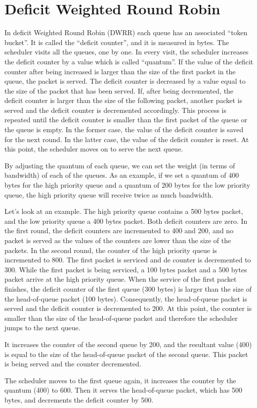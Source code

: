 \section{Deficit Weighted Round Robin}

In deficit Weighted Round Robin (DWRR) each queue has an associated ``token bucket''.
It is called the ``deficit counter'', and it is measured in bytes.
The scheduler visits all the queues, one by one.
In every visit, the scheduler increases the deficit counter by a value which is called ``quantum''.
If the value of the deficit counter after being increased is larger than the size of the first packet in the queue, the packet is served.
The deficit counter is decreased by a value equal to the size of the packet that has been served.
If, after being decremented, the deficit counter is larger than the size of the following packet, another packet is served and the deficit counter is decremented accordingly.
This process is repeated until the deficit counter is smaller than the first packet of the queue or the queue is empty.
In the former case, the value of the deficit counter is saved for the next round.
In the latter case, the value of the deficit counter is reset.
At this point, the scheduler moves on to serve the next queue.

By adjusting the quantum of each queue, we can set the weight (in terms of bandwidth) of each of the queues.
As an example, if we set a quantum of 400 bytes for the high priority queue and a quantum of 200 bytes for the low priority queue, the high priority queue will receive twice as much bandwidth.

Let's look at an example.
The high priority queue contains a 500 bytes packet, and the low priority queue a 400 bytes packet.
Both deficit counters are zero.
In the first round, the deficit counters are incremented to 400 and 200, and no packet is served as the values of the counters are lower than the size of the packets.
In the second round, the counter of the high priority queue is incremented to 800.
The first packet is serviced and de counter is decremented to 300.
While the first packet is being serviced, a 100 bytes packet and a 500 bytes packet arrive at the high priority queue.
When the service of the first packet finishes, the deficit counter of the first queue (300 bytes) is larger than the size of the head-of-queue packet (100 bytes).
Consequently, the head-of-queue packet is served and the deficit counter is decremented to 200.
At this point, the counter is smaller than the size of the head-of-queue packet and therefore the scheduler jumps to the next queue.

It increases the counter of the second queue by 200, and the resultant value (400) is equal to the size of the head-of-queue packet of the second queue.
This packet is being served and the counter decremented.

The scheduler moves to the first queue again, it increases the counter by the quantum (400) to 600.
Then it serves the head-of-queue packet, which has 500 bytes, and decrements the deficit counter by 500.

